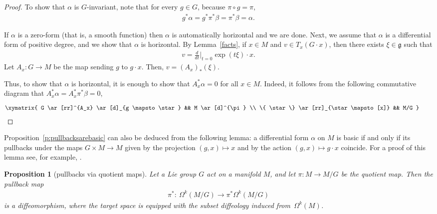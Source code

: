 \documentclass[pdftex]{sigma}
\numberwithin{equation}{section}
\newtheorem{Proposition}[Theorem]{Proposition}
\newcommand{\g}{{\mathfrak{g}}} %
\newcommand{\hypref}[2]{{#2~\ref{#1}}}
\begin{document}
\begin{proof}
To show that $\alpha$ is $G$-invariant, note that for every $g \in G$, because $\pi\circ g=\pi$,
\begin{gather*}
g^* \alpha = g^* \pi^* \beta = \pi^* \beta = \alpha.
\end{gather*}

If $\alpha$ is a zero-form (that is, a smooth function)
then $\alpha$ is automatically horizontal and we are done.
Next, we assume that $\alpha$ is a dif\/ferential form of positive degree,
and we show that $\alpha$ is horizontal.
By Lemma~\ref{facts}, if $x\in M$ and $v\in T_x(G\cdot x)$, then there exists
$\xi\in\g$ such that
\begin{gather*}v=\frac{d}{dt}\Big|_{t=0}\exp(t\xi) \cdot x .\end{gather*}
Let $A_x\colon G\to M$ be the map sending $g$ to $g\cdot x$. Then, $v=(A_x)_*(\xi)$.

Thus, to show that $\alpha$ is horizontal, it is enough to show that $A_x^*\alpha=0$ for all $x\in M$. Indeed, it follows from the following commutative diagram that $A_x^*\alpha=A_x^*\pi^*\beta=0$,
\begin{gather*}
\begin{gathered}[b]
\xymatrix{
 G \ar[rr]^{A_x} \ar[d]_{g \mapsto \star} && M \ar[d]^{\pi} \\
 \{ \star \} \ar[rr]_{\star \mapsto [x]} && M/G
}\\[-17pt]
\null
\end{gathered}\tag*{\qed}
\end{gather*}
 \renewcommand{\qed}{}
\end{proof}

\begin{Remark}
\hypref{p:pullbacksarebasic}{Proposition} can also be deduced
from the following lemma:
a dif\/ferential form $\alpha$ on $M$ is basic
if and only if its pullbacks under the maps $G \times M \to M$
given by the projection $(g,x)\mapsto x$
and by the action $(g,x) \mapsto g\cdot x$ coincide.
For a proof of this lemma see, for example,
\cite[Lemma~3.3]{watts-groupoids}.
\end{Remark}

\begin{Proposition}[pullbacks via quotient maps]
\label{p:injectivity}
Let a Lie group $G$ act on a manifold $M$,
and let $\pi \colon M \to M/G$ be the quotient map.
Then the pullback map
\begin{gather*} \pi^* \colon \ \Omega^k(M/G) \to \pi^*\Omega^k(M/G) \end{gather*}
is a diffeomorphism,
where the target space is equipped with the subset diffeology
induced \linebreak from~$\Omega^k(M)$.
\end{Proposition}
\end{document}
